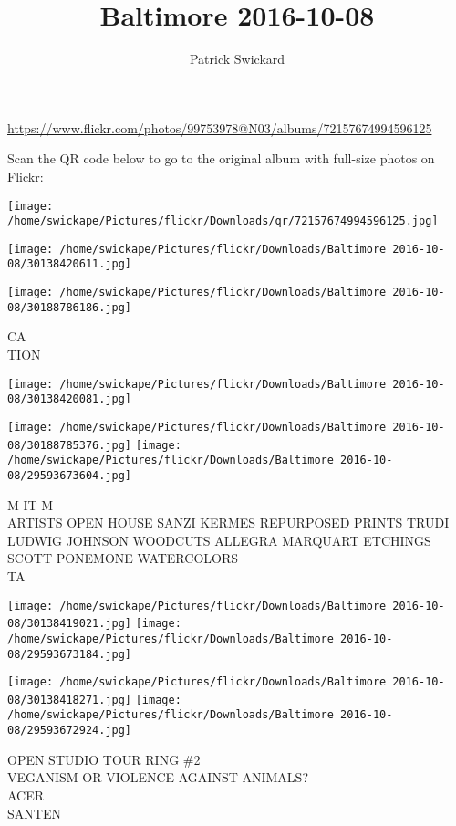 \documentclass[10pt,letterpaper]{article}
\title{Baltimore 2016-10-08}
\author{Patrick Swickard}
\date{}
\begin{document}
\maketitle

\url{https://www.flickr.com/photos/99753978@N03/albums/72157674994596125}

Scan the QR code below to go to the original album with full-size photos on Flickr:

\texttt{[image: /home/swickape/Pictures/flickr/Downloads/qr/72157674994596125.jpg]}
\pagebreak

\texttt{[image: /home/swickape/Pictures/flickr/Downloads/Baltimore 2016-10-08/30138420611.jpg]}

\vspace{0.25in}
\texttt{[image: /home/swickape/Pictures/flickr/Downloads/Baltimore 2016-10-08/30188786186.jpg]}

CA\\
TION
\pagebreak

\texttt{[image: /home/swickape/Pictures/flickr/Downloads/Baltimore 2016-10-08/30138420081.jpg]}

\vspace{0.25in}
\texttt{[image: /home/swickape/Pictures/flickr/Downloads/Baltimore 2016-10-08/30188785376.jpg]}
\texttt{[image: /home/swickape/Pictures/flickr/Downloads/Baltimore 2016-10-08/29593673604.jpg]}

M IT M\\
ARTISTS OPEN HOUSE SANZI KERMES REPURPOSED PRINTS TRUDI LUDWIG JOHNSON WOODCUTS ALLEGRA MARQUART ETCHINGS SCOTT PONEMONE WATERCOLORS\\
TA
\pagebreak

\texttt{[image: /home/swickape/Pictures/flickr/Downloads/Baltimore 2016-10-08/30138419021.jpg]}
\texttt{[image: /home/swickape/Pictures/flickr/Downloads/Baltimore 2016-10-08/29593673184.jpg]}

\texttt{[image: /home/swickape/Pictures/flickr/Downloads/Baltimore 2016-10-08/30138418271.jpg]}
\texttt{[image: /home/swickape/Pictures/flickr/Downloads/Baltimore 2016-10-08/29593672924.jpg]}

OPEN STUDIO TOUR RING \#2\\
VEGANISM OR VIOLENCE AGAINST ANIMALS?\\
ACER\\
SANTEN
\pagebreak
\end{document}
